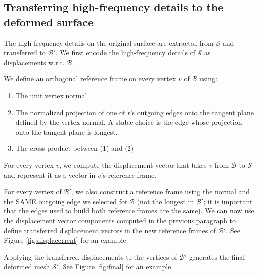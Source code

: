 \documentclass[11pt]{amsart}
\begin{document}
\subsection{Transferring high-frequency details to the deformed surface}
The high-frequency details on the original surface are extracted from $\mathcal{S}$ and transferred to $\mathcal{B}'$. We first encode the high-frequency details of $\mathcal{S}$ as displacements w.r.t. $\mathcal{B}$.

We define an orthogonal reference frame on every vertex $v$ of $\mathcal{B}$ using:
\begin{enumerate}
\item The unit vertex normal
\item The normalized projection of one of $v$'s outgoing edges onto the tangent plane defined by the vertex normal. A stable choice is the edge whose projection onto the tangent plane is longest.
\item The cross-product between (1) and (2)
\end{enumerate}

For every vertex $v$, we compute the displacement vector that takes $v$ from $\mathcal{B}$ to $\mathcal{S}$ and represent it as a vector in $v$'s reference frame.

For every vertex of $\mathcal{B}'$, we also construct a reference frame using the normal and the SAME outgoing edge we selected for $\mathcal{B}$ (not the longest in $\mathcal{B}'$; it is important that the edges used to build both reference frames are the same). We can now use the displacement vector components computed in the previous paragraph to define transferred displacement vectors in the new reference frames of $\mathcal{B}'$. See Figure \ref{fig:displacement} for an example.

Applying the transferred displacements to the vertices of $\mathcal{B}'$ generates the final deformed mesh $\mathcal{S}'$. See Figure \ref{fig:final} for an example.
\end{document}

